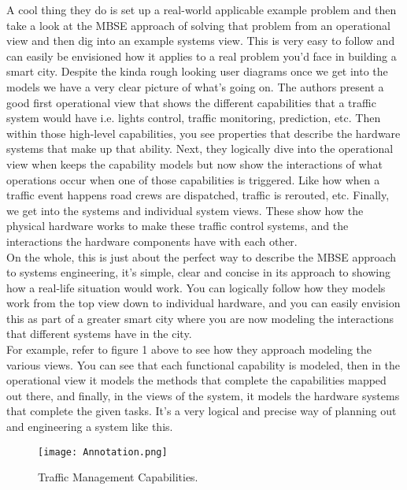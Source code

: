 \documentclass[11pt]{asme2ej}
\begin{document}
A cool thing they do is set up a real-world applicable example problem and then take a look at the MBSE approach of solving that problem from an operational view and then dig into an example systems view. 
This is very easy to follow and can easily be envisioned how it applies to a real problem you'd face in building a smart city.
Despite the kinda rough looking user diagrams once we get into the models we have a very clear picture of what's going on. 
The authors present a good first operational view that shows the different capabilities that a traffic system would have i.e. lights control, traffic monitoring, prediction, etc. 
Then within those high-level capabilities, you see properties that describe the hardware systems that make up that ability.
Next, they logically dive into the operational view when keeps the capability models but now show the interactions of what operations occur when one of those capabilities is triggered.
Like how when a traffic event happens road crews are dispatched, traffic is rerouted, etc.
Finally, we get into the systems and individual system views. 
These show how the physical hardware works to make these traffic control systems, and the interactions the hardware components have with each other.\\

On the whole, this is just about the perfect way to describe the MBSE approach to systems engineering, it's simple, clear and concise in its approach to showing how a real-life situation would work.
You can logically follow how they models work from the top view down to individual hardware, and you can easily envision this as part of a greater smart city where you are now modeling the interactions that different systems have in the city.\\

For example, refer to figure 1 above to see how they approach modeling the various views. 
You can see that each functional capability is modeled, then in the operational view it models the methods that complete the capabilities mapped out there, and finally, in the views of the system, it models the hardware systems that complete the given tasks.
It's a very logical and precise way of planning out and engineering a system like this.

\begin{figure}
    \centering
    \texttt{[image: Annotation.png]}
    \caption{Traffic Management Capabilities.}
    \label{fig:Traffic}
\end{figure}
\end{document}
